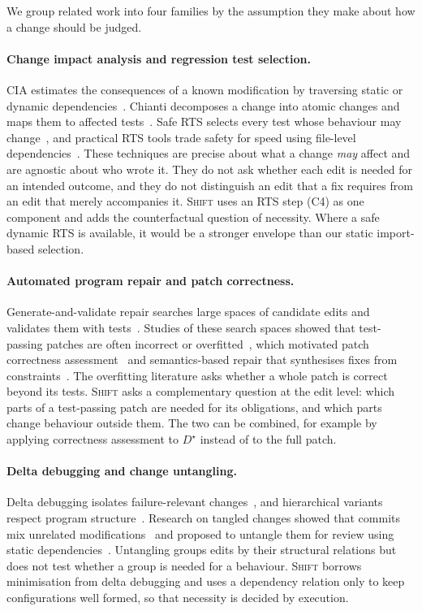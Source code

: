 \documentclass[a4paper,fleqn]{cas-sc}
\newcommand{\tool}{\textsc{Shift}}
\begin{document}
We group related work into four families by the assumption they make about how a change should be judged.

\paragraph{Change impact analysis and regression test selection.} CIA estimates the consequences of a known modification by traversing static or dynamic dependencies~\citep{bohner1996cia,li2013cia,orso2003field}. Chianti decomposes a change into atomic changes and maps them to affected tests~\citep{ren2004chianti}. Safe RTS selects every test whose behaviour may change~\citep{rothermel1997safe}, and practical RTS tools trade safety for speed using file-level dependencies~\citep{gligoric2015ekstazi}. These techniques are precise about what a change \emph{may} affect and are agnostic about who wrote it. They do not ask whether each edit is needed for an intended outcome, and they do not distinguish an edit that a fix requires from an edit that merely accompanies it. \tool{} uses an RTS step (C4) as one component and adds the counterfactual question of necessity. Where a safe dynamic RTS is available, it would be a stronger envelope than our static import-based selection.

\paragraph{Automated program repair and patch correctness.} Generate-and-validate repair searches large spaces of candidate edits and validates them with tests~\citep{legoues2012genprog,long2016prophet}. Studies of these search spaces showed that test-passing patches are often incorrect or overfitted~\citep{qi2015kali,long2016searchspace,smith2015cure}, which motivated patch correctness assessment~\citep{wang2020apr,monperrus2018living} and semantics-based repair that synthesises fixes from constraints~\citep{nguyen2013semfix,mechtaev2016angelix}. The overfitting literature asks whether a whole patch is correct beyond its tests. \tool{} asks a complementary question at the edit level: which parts of a test-passing patch are needed for its obligations, and which parts change behaviour outside them. The two can be combined, for example by applying correctness assessment to $D^\star$ instead of to the full patch.

\paragraph{Delta debugging and change untangling.} Delta debugging isolates failure-relevant changes~\citep{zeller1999yesterday,zeller2002ddmin}, and hierarchical variants respect program structure~\citep{misherghi2006hdd}. Research on tangled changes showed that commits mix unrelated modifications~\citep{herzig2013tangled,kirinuki2014tangled} and proposed to untangle them for review using static dependencies~\citep{barnett2015untangle,dias2015untangling}. Untangling groups edits by their structural relations but does not test whether a group is needed for a behaviour. \tool{} borrows minimisation from delta debugging and uses a dependency relation only to keep configurations well formed, so that necessity is decided by execution.
\end{document}
